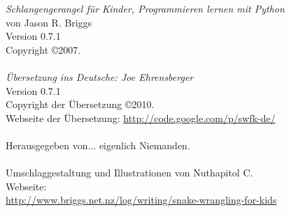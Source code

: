 \noindent
\textsf{\emph{Schlangengerangel für Kinder, Programmieren lernen mit Python}}\\
von Jason R. Briggs\\
Version 0.7.1
\\
Copyright \copyright 2007.\\
\\
\textsf{\emph{Übersetzung ins Deutsche: Joe Ehrensberger}}\\
Version 0.7.1\\
Copyright der Übersetzung \copyright 2010.\\
Webseite der Übersetzung: \href{http://code.google.com/p/swfk-de/}{http://code.google.com/p/swfk-de/}\\
\\
Herausgegeben von... eigenlich Niemanden.\\
\\
Umschlaggestaltung und Illustrationen von Nuthapitol C.\\
\linebreak 
\noindent
Webseite:\\ \href{http://www.briggs.net.nz/log/writing/snake-wrangling-for-kids}{http://www.briggs.net.nz/log/writing/snake-wrangling-for-kids}\\ 

